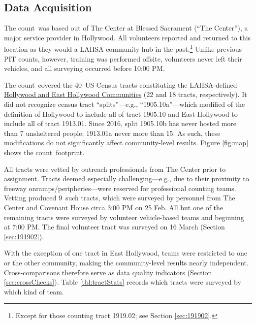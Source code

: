 \documentclass[11pt,twocolumn]{article}
\def\Count{count}
\def\ntracts{40}
\def\nprof{9}
\def\resp{respectively}
\begin{document}
\subsection{Data Acquisition}
\label{sec:acquisition}

The \Count\ was based out of The Center at Blessed Sacrament (``The Center''), a major service 
provider in Hollywood. All volunteers reported and returned to this location as they would a LAHSA 
community hub in the past.\footnote{Except for those counting tract 1919.02; see Section \ref{sec:191902}.} 
Unlike previous PIT counts, however, training was performed offsite, volunteers never left their vehicles, 
and all surveying occurred before 10:00 PM.

The \Count\ covered the \ntracts\ US Census tracts constituting the LAHSA-defined 
\href{https://www.lahsa.org/data?id=45-2020-homeless-count-by-community-city}{Hollywood 
and East Hollywood Communities} (22 and 18 tracts, \resp). It did not recognize census 
tract ``splits''---e.g., ``1905.10a''---which modified of the definition of Hollywood to include 
all of tract 1905.10 and East Hollywood to include all of tract 1913.01. Since 2016, split 1905.10b 
has never hosted more than 7 unsheltered people; 1913.01a never more than 15. As such,
these modifications do not significantly affect community-level results.
Figure \ref{fig:map} shows the \Count\ footprint.

All tracts were vetted by outreach professionals from The Center prior to assignment. Tracts 
deemed especially challenging---e.g., due to their proximity to freeway onramps/peripheries---were 
reserved for professional counting teams. Vetting produced \nprof\ such tracts, which were surveyed 
by personnel from The Center and Covenant House circa 3:00 PM on 25 Feb. All but one of the remaining 
tracts were surveyed by volunteer vehicle-based teams and beginning at 7:00 PM. The final volunteer tract 
was surveyed on 16 March (Section \ref{sec:191902}).

With the exception of one tract in East Hollywood, teams were restricted to one or the other community, 
making the community-level results nearly independent. Cross-comparisons therefore serve as data 
quality indicators (Section \ref{sec:crossChecks}). Table \ref{tbl:tractStats} records which tracts were 
surveyed by which kind of team. 
\end{document}
